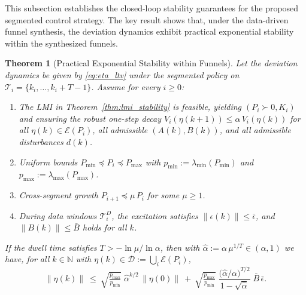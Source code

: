 \documentclass[letterpaper, 10 pt, conference]{ieeeconf}
\newtheorem{theorem}{Theorem}
\begin{document}
This subsection establishes the closed-loop stability guarantees for the proposed segmented control strategy. The key result shows that, under the data-driven funnel synthesis, the deviation dynamics exhibit practical exponential stability within the synthesized funnels.

\begin{theorem}[Practical Exponential Stability within Funnels]
\label{thm:pges_main}
Let the deviation dynamics be given by \eqref{eq:eta_ltv} under the segmented policy on $\mathcal{T}_i=\{k_i,\dots,k_i+T-1\}$. 
Assume for every $i\ge0$:
\begin{enumerate}
\item[(i)] The LMI in Theorem~\ref{thm:lmi_stability} is feasible, yielding $(P_i\succ0,K_i)$ and ensuring the robust one-step decay
$V_i(\eta(k{+}1))\le \alpha\,V_i(\eta(k))$ for all $\eta(k)\in\mathcal E(P_i)$, all admissible $(A(k),B(k))$, and all admissible disturbances $d(k)$.
\item[(ii)] Uniform bounds $P_{\min}\preceq P_i\preceq P_{\max}$ with $p_{\min}:=\lambda_{\min}(P_{\min})$ and $p_{\max}:=\lambda_{\max}(P_{\max})$.
\item[(iii)] Cross-segment growth $P_{i+1}\preceq \mu\,P_i$ for some $\mu\ge1$.
\item[(iv)] During data windows $\mathcal{T}_i^D$, the excitation satisfies $\|\epsilon(k)\|\le\bar\epsilon$, and $\|B(k)\|\le\bar B$ holds for all $k$.
\end{enumerate}
If the dwell time satisfies $T>-\ln\mu/\ln\alpha$, then with $\hat\alpha:=\alpha\,\mu^{1/T}\in(\alpha,1)$ we have, for all $k\in\mathbb N$ with $\eta(k)\in\mathcal D:=\bigcup_i\mathcal E(P_i)$,
\begin{equation}
\label{eq:pges_bound_final_norm}
\|\eta(k)\|\ \le\
\sqrt{\tfrac{p_{\max}}{p_{\min}}}\;\hat{\alpha}^{k/2}\,\|\eta(0)\|
\ +\
\sqrt{\tfrac{p_{\max}}{p_{\min}}}\;
\frac{\big(\hat{\alpha}/\alpha\big)^{T/2}}{1-\sqrt{\hat{\alpha}}}\;\bar B\,\bar\epsilon.
\end{equation}
\end{theorem}
\end{document}

